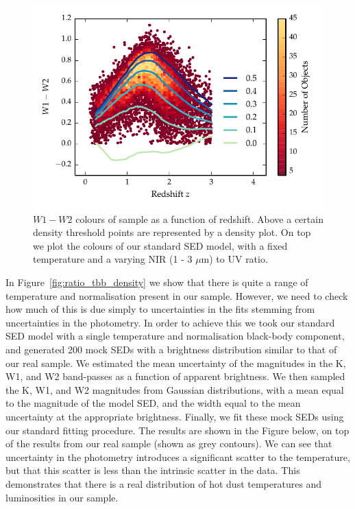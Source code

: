 \begin{figure}
\centering
\includegraphics[width=\columnwidth]{figures/chapter05/w1w2_versus_redshift_ratio.pdf}
\caption{$W1 - W2$ colours of sample as a function of redshift. Above a certain density threshold points are represented by a density plot. On top we plot the colours of our standard SED model, with a fixed temperature and a varying NIR (1 - 3 $\mu$m) to UV ratio.}
  \label{fig:w1w2colorsratio}
\end{figure}

In Figure~\ref{fig:ratio_tbb_density} we show that there is quite a range of temperature and normalisation present in our sample. 
However, we need to check how much of this is due simply to uncertainties in the fits stemming from uncertainties in the photometry. 
In order to achieve this we took our standard SED model with a single temperature and normalisation black-body component, and generated 200 mock SEDs with a brightness distribution similar to that of our real sample. 
We estimated the mean uncertainty of the magnitudes in the K, W1, and W2 band-passes as a function of apparent brightness. 
We then sampled the K, W1, and W2 magnitudes from Gaussian distributions, with a mean equal to the magnitude of the model SED, and the width equal to the mean uncertainty at the appropriate brightness. 
Finally, we fit these mock SEDs using our standard fitting procedure. 
The results are shown in the Figure below, on top of the results from our real sample (shown as grey contours). 
We can see that uncertainty in the photometry introduces a significant scatter to the temperature, but that this scatter is less than the intrinsic scatter in the data. 
This demonstrates that there is a real distribution of hot dust temperatures and luminosities in our sample. 

